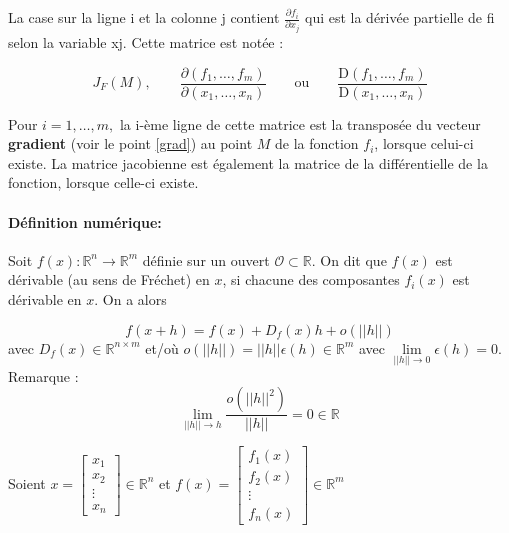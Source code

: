 	La case sur la ligne i et la colonne j contient ${\displaystyle {\frac {\partial f_{i}}{\partial x_{j}}}}$ qui est la dérivée partielle de fi selon la variable xj. Cette matrice est notée :
	
	$${\displaystyle J_{F}\left(M\right),\qquad {\frac {\partial \left(f_{1},\ldots ,f_{m}\right)}{\partial \left(x_{1},\ldots ,x_{n}\right)}}\qquad {\text{ou}}\qquad {\frac {\mathrm {D} \left(f_{1},\ldots ,f_{m}\right)}{\mathrm {D} \left(x_{1},\ldots ,x_{n}\right)}}}$$
	
	Pour $i = 1, … , m,$ la i-ème ligne de cette matrice est la transposée du vecteur \textbf{gradient} (voir le point \ref{grad}) au point $M$ de la fonction $f_i$, lorsque celui-ci existe. La matrice jacobienne est également la matrice de la différentielle de la fonction, lorsque celle-ci existe.
	\paragraph*{Définition numérique:}
	
	Soit $f(x) : \mathbb{R}^n \to \mathbb{R}^m$ définie sur un ouvert $ \mathcal{O} \subset \mathbb{R} $. On dit que $f(x)$ est dérivable
	(au sens de Fréchet) en $x$, si chacune des composantes $f_i(x)$ est dérivable  en $x$. On a alors
	
	\begin{equation}
		f(x + h) = f(x) + D_f (x)h + o(||h||)
	\end{equation}
	avec $D_f (x) \in  \mathbb{R}^{n \times m} $ et/où $ o(||h||)=||h|| \epsilon(h) \in \mathbb{R}^m $ avec $\lim\limits_{||h|| \to 0} \epsilon(h) = 0 $.
	Remarque :
	$$
		\lim\limits_{||h|| \to h} \frac{o(||h||^2)}{||h||} = 0  \in \mathbb{R}
	$$
	
	Soient 
	$x = 
		\begin{bmatrix}
			x_1 \\ x_2\\ \vdots \\ x_n
		\end{bmatrix}
		\in \mathbb{R}^n $ et $ 
	f(x) = 
		\begin{bmatrix}
			f_1(x) \\ f_2(x)\\ \vdots \\ f_n(x)
		\end{bmatrix} \in \mathbb{R}^m
	$
	
